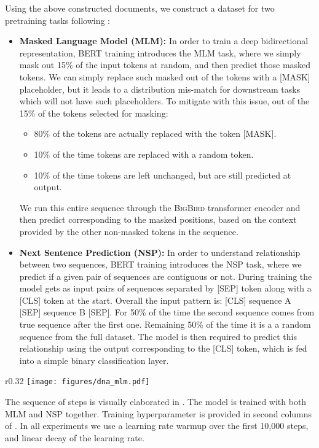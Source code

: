 \documentclass{article}
\newcommand{\bigb}{\textsc{BigBird}\xspace}
\begin{document}
Using the above constructed documents, we construct a dataset for two pretraining tasks following \citet{devlin2018bert}:
\begin{itemize}[leftmargin=6mm, itemsep=2mm, partopsep=0pt,parsep=0pt]
    \item \textbf{Masked Language Model (MLM):} 
    In order to train a deep bidirectional representation, BERT training introduces the MLM task, where we simply mask out 15\% of the input tokens at random, and then predict those masked tokens.
    We can simply replace such masked out of the tokens with a [MASK] placeholder, but it leads to a distribution mis-match for downstream tasks which will not have such placeholders. To mitigate with this issue, out of the 15\% of the tokens selected for masking:
    \begin{itemize}
        \item 80\% of the tokens are actually replaced with the token [MASK].
        \item 10\% of the time tokens are replaced with a random token.
        \item 10\% of the time tokens are left unchanged, but are still predicted at output.
    \end{itemize}
    We run this entire sequence through the \bigb transformer encoder and then predict corresponding to the masked positions, based on the context provided by the other non-masked tokens in the sequence.

    \item \textbf{Next Sentence Prediction (NSP):} 
    In order to understand relationship between two sequences, BERT training introduces the NSP task, where we predict if a given pair of sequences are contiguous or not.
    During training the model gets as input pairs of sequences separated by [SEP] token along with a [CLS] token at the start. Overall the input pattern is: [CLS] sequence A [SEP] sequence B [SEP]. For 50\% of the time the second sequence comes from true sequence after the first one. Remaining 50\% of the time it is a a random sequence from the full dataset. The model is then required to predict this relationship using the output corresponding to the [CLS] token, which is fed into a simple binary classification layer.
\end{itemize}

\begin{wrapfigure}{r}{0.32\textwidth}
    \vspace{-2mm}
    \centering
    \texttt{[image: figures/dna\_mlm.pdf]}
    \vspace{-5mm}
    \caption{\bigb accuracy with context length.}
    \label{fig:apndx_dna_mlm}
\end{wrapfigure}
The sequence of steps is visually elaborated in .
The model is trained with both MLM and NSP together. Training hyperparameter is provided in second columns of . In all experiments we use a learning
rate warmup over the first 10,000 steps, and linear
decay of the learning rate.
\end{document}
